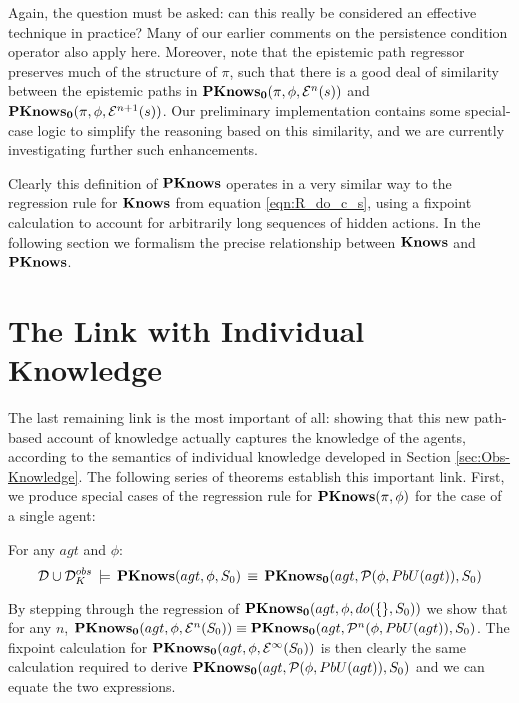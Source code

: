 Again, the question must be asked: can this really be considered an
effective technique in practice? Many of our earlier comments on the
persistence condition operator also apply here. Moreover, note that
the epistemic path regressor preserves much of the structure of $\pi$,
such that there is a good deal of similarity between the epistemic
paths in $\mathbf{PKnows_{0}}(\pi,\phi,\mathcal{E}^{n}(s))$ and $\mathbf{PKnows_{0}}(\pi,\phi,\mathcal{E}^{n+1}(s))$.
Our preliminary implementation contains some special-case logic to
simplify the reasoning based on this similarity, and we are currently
investigating further such enhancements.

Clearly this definition of $\mathbf{PKnows}$ operates in a very similar way
to the regression rule for $\mathbf{Knows}$ from equation \eqref{eqn:R_do_c_s},
using a fixpoint calculation to account for arbitrarily long sequences
of hidden actions. In the following section we formalism the precise
relationship between $\mathbf{Knows}$ and $\mathbf{PKnows}$.


\section{The Link with Individual Knowledge\label{sub:The-Link-with-IK}}

The last remaining link is the most important of all: showing that
this new path-based account of knowledge actually captures the knowledge
of the agents, according to the semantics of individual knowledge
developed in Section \ref{sec:Obs-Knowledge}. The following series
of theorems establish this important link. First, we produce special
cases of the regression rule for $\mathbf{PKnows}(\pi,\phi)$ for the case
of a single agent:

\begin{thm}
\label{thm:Pknows_PbU_S0}For any $agt$ and $\phi$:\[
\mathcal{D}\cup\mathcal{D}_{K}^{obs}\,\models\,\mathbf{PKnows}(agt,\phi,S_{0})\,\equiv\,\mathbf{PKnows_{0}}(agt,\mathcal{P}(\phi,PbU(agt)),S_{0})\]

\end{thm}
\begin{proofsketch}
By stepping through the regression of $\mathbf{PKnows_{0}}(agt,\phi,do(\{\},S_{0}))$
we show that for any $n$, $\mathbf{PKnows_{0}}(agt,\phi,\mathcal{E}^{n}(S_{0}))\equiv\mathbf{PKnows_{0}}(agt,\mathcal{P}^{n}(\phi,PbU(agt)),S_{0})$.
The fixpoint calculation for $\mathbf{PKnows_{0}}(agt,\phi,\mathcal{E}^{\infty}(S_{0}))$
is then clearly the same calculation required to derive $\mathbf{PKnows_{0}}(agt,\mathcal{P}(\phi,PbU(agt)),S_{0})$
and we can equate the two expressions. 
\end{proofsketch}
\medskip{}


